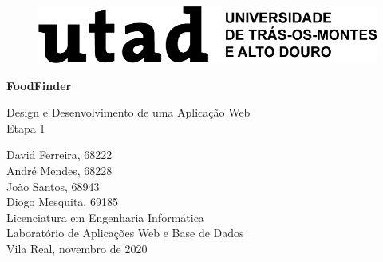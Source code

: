 \documentclass[a4paper,12pt]{report}
\begin{document}
	
	\begin{titlepage}
		\begin{center}
		
		\begin{figure}[H]
		\begin{center}
			\includegraphics[scale=0.45]{logo_utad_completo_preto}	
		\end{center}
		\label{fig:logoUTAD}	
		\end{figure}
		
		\vspace{3cm}
		\huge
		\textbf{FoodFinder}
		
		\Large
		Design e Desenvolvimento de uma Aplicação Web\\
		Etapa 1
		
		
		\vspace{2.5cm}
		\large
		David Ferreira, 68222\\
		André Mendes, 68228\\
		João Santos, 68943\\
		Diogo Mesquita, 69185\\
		
		\vspace{2.5cm}
		Licenciatura em Engenharia Informática\\
		Laboratório de Aplicações Web e Base de Dados \\
		
		\vspace{1.5cm}		
		Vila Real, novembro de 2020
		
		\end{center}
	\end{titlepage}	
	
	
	
	
	
	
	
\end{document}
